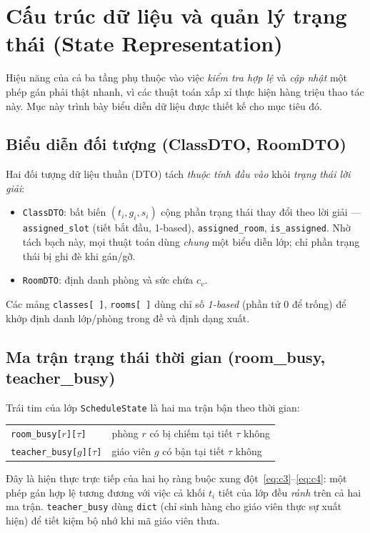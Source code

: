 \section{Cấu trúc dữ liệu và quản lý trạng thái (State Representation)}
\label{sec:data}

Hiệu năng của cả ba tầng phụ thuộc vào việc \emph{kiểm tra hợp lệ} và \emph{cập
nhật} một phép gán phải thật nhanh, vì các thuật toán xấp xỉ thực hiện hàng triệu
thao tác này. Mục này trình bày biểu diễn dữ liệu được thiết kế cho mục tiêu đó.

\subsection{Biểu diễn đối tượng (ClassDTO, RoomDTO)}
Hai đối tượng dữ liệu thuần (DTO) tách \emph{thuộc tính đầu vào} khỏi \emph{trạng
thái lời giải}:
\begin{itemize}
  \item \texttt{ClassDTO}: bất biến $(t_i,g_i,s_i)$ cộng phần trạng thái thay đổi
  theo lời giải --- \texttt{assigned\_slot} (tiết bắt đầu, 1-based), \texttt{assigned\_room},
  \texttt{is\_assigned}. Nhờ tách bạch này, mọi thuật toán dùng \emph{chung} một
  biểu diễn lớp; chỉ phần trạng thái bị ghi đè khi gán/gỡ.
  \item \texttt{RoomDTO}: định danh phòng và sức chứa $c_v$.
\end{itemize}
Các mảng \texttt{classes[\,]}, \texttt{rooms[\,]} dùng chỉ số \emph{1-based} (phần
tử $0$ để trống) để khớp định danh lớp/phòng trong đề và định dạng xuất.

\subsection{Ma trận trạng thái thời gian (room\_busy, teacher\_busy)}
Trái tim của lớp \texttt{ScheduleState} là hai ma trận bận theo thời gian:
\begin{center}
\begin{tabular}{ll}
\toprule
\texttt{room\_busy[$r$][$\tau$]} & phòng $r$ có bị chiếm tại tiết $\tau$ không \\
\texttt{teacher\_busy[$g$][$\tau$]} & giáo viên $g$ có bận tại tiết $\tau$ không \\
\bottomrule
\end{tabular}
\end{center}
Đây là hiện thực trực tiếp của hai họ ràng buộc xung đột~\eqref{eq:c3}--\eqref{eq:c4}:
một phép gán hợp lệ tương đương với việc cả khối $t_i$ tiết của lớp đều \emph{rảnh}
trên cả hai ma trận. \texttt{teacher\_busy} dùng \texttt{dict} (chỉ sinh hàng cho
giáo viên thực sự xuất hiện) để tiết kiệm bộ nhớ khi mã giáo viên thưa.


